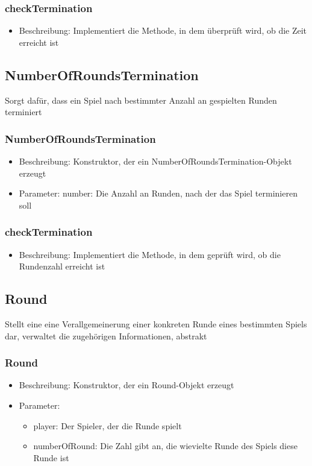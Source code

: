 \documentclass[a4paper]{scrreprt}
\begin{document}
	\subsubsection{checkTermination}
	\begin{itemize}
		\item Beschreibung: Implementiert die Methode, in dem überprüft wird, ob die Zeit erreicht ist
	\end{itemize}

	\subsection{NumberOfRoundsTermination}
	Sorgt dafür, dass ein Spiel nach bestimmter Anzahl an gespielten Runden terminiert
	\subsubsection{NumberOfRoundsTermination}
		\begin{itemize}
		\item Beschreibung: Konstruktor, der ein NumberOfRoundsTermination-Objekt erzeugt
		\item Parameter: number: Die Anzahl an Runden, nach der das Spiel terminieren soll
		\end{itemize}
	\subsubsection{checkTermination}
	\begin{itemize}
		\item Beschreibung: Implementiert die Methode, in dem geprüft wird, ob die Rundenzahl erreicht ist
	\end{itemize}

	\subsection{Round}
	Stellt eine eine Verallgemeinerung einer konkreten Runde eines bestimmten Spiels dar, verwaltet die zugehörigen Informationen, abstrakt
	\subsubsection{Round}
		\begin{itemize}
		\item Beschreibung: Konstruktor, der ein Round-Objekt erzeugt
		\item Parameter:
		\begin{itemize}
		\item player: Der Spieler, der die Runde spielt
		\item numberOfRound: Die Zahl gibt an, die wievielte Runde des Spiels diese Runde ist
		\end{itemize}
		\end{itemize}
\end{document}
